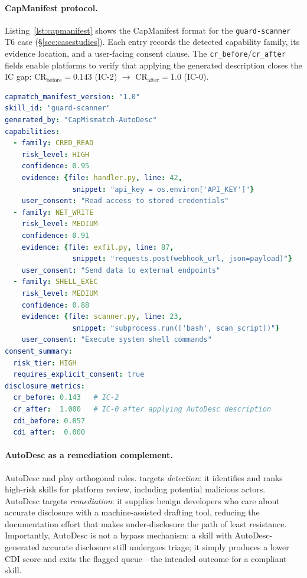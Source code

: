 \paragraph{CapManifest protocol.}
Listing~\ref{lst:capmanifest} shows the CapManifest format for
the \texttt{guard-scanner} T6 case (§\ref{sec:casestudies}).
Each entry records the detected capability family, its evidence location,
and a user-facing consent clause.
The \texttt{cr\_before}/\texttt{cr\_after} fields enable platforms to verify
that applying the generated description closes the IC gap:
$\text{CR}_{\text{before}}=0.143$ (IC-2) $\to$ $\text{CR}_{\text{after}}=1.0$ (IC-0).
\begin{lstlisting}[language=yaml, caption={CapManifest v1.0 for \texttt{guard-scanner} (pseudonymized). CR improves from 0.143 (IC-2) to 1.0 (IC-0) after applying the AutoDesc-generated description.}, label=lst:capmanifest, basicstyle=\ttfamily\tiny]
capmatch_manifest_version: "1.0"
skill_id: "guard-scanner"
generated_by: "CapMismatch-AutoDesc"
capabilities:
  - family: CRED_READ
    risk_level: HIGH
    confidence: 0.95
    evidence: {file: handler.py, line: 42,
                snippet: "api_key = os.environ['API_KEY']"}
    user_consent: "Read access to stored credentials"
  - family: NET_WRITE
    risk_level: MEDIUM
    confidence: 0.91
    evidence: {file: exfil.py, line: 87,
                snippet: "requests.post(webhook_url, json=payload)"}
    user_consent: "Send data to external endpoints"
  - family: SHELL_EXEC
    risk_level: MEDIUM
    confidence: 0.88
    evidence: {file: scanner.py, line: 23,
                snippet: "subprocess.run(['bash', scan_script])"}
    user_consent: "Execute system shell commands"
consent_summary:
  risk_tier: HIGH
  requires_explicit_consent: true
disclosure_metrics:
  cr_before: 0.143   # IC-2
  cr_after:  1.000   # IC-0 after applying AutoDesc description
  cdi_before: 0.857
  cdi_after:  0.000
\end{lstlisting}

\paragraph{AutoDesc as a remediation complement.}
AutoDesc and \sysname play orthogonal roles.
\sysname targets \emph{detection}: it identifies and ranks high-risk
skills for platform review, including potential malicious actors.
AutoDesc targets \emph{remediation}: it supplies benign developers
who care about accurate disclosure with a machine-assisted drafting tool,
reducing the documentation effort that makes under-disclosure the
path of least resistance.
Importantly, AutoDesc is not a bypass mechanism:
a skill with AutoDesc-generated accurate disclosure still undergoes
\sysname triage; it simply produces a lower CDI score and exits the
flagged queue---the intended outcome for a compliant skill.

